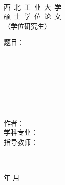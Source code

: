 \begin{titlepage}
	
    \sSanhao ~
    \begin{spacing}{1.5}
    	\begin{center}
    		\begin{center}
    			{
    				
    				\sSanhao 西~北~工~业~大~学 \\
    				\sYihao 硕~士~学~位~论~文 \\
    				\sSihao （学位研究生）\\
    			}
    		\end{center}
    		
			\vskip 5cm
    		
    			
			\sErhao \fSong \hspace{1em} 题目：\hspace{0.2cm}\\
			\hspace{3.5cm}    			
    			
    		
    		\fSong \sWuhao ~ \\
    		\fSong \sWuhao ~ \\
    		\fSong \sWuhao ~ \\
    		\fSong \sWuhao ~ \\
    		\fSong \sWuhao ~ \\
    		\fSong \sWuhao ~ \\
    		{
    			\sSanhao\fSong 
    			作\hspace{32pt}者：\\
    			\sSanhao\fSong 学科专业：\\
    			\sSanhao\fSong 指导教师：
    			
    		}
    		\fSong \sWuhao ~ \\
    		\fSong \sWuhao ~ \\
    		\fSong \sSanhao {}\fSong 年 \fSong 月
    	\end{center}
    \end{spacing}
    
\end{titlepage}
\fSong \normalsize

\endinput
